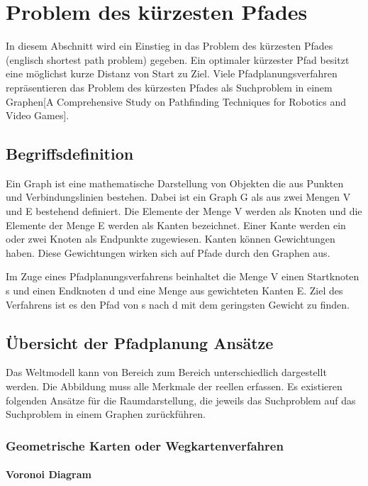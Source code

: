 \chapter{Problem des kürzesten Pfades}

In diesem Abschnitt wird ein Einstieg in das Problem des kürzesten Pfades (englisch shortest path problem) gegeben. Ein optimaler kürzester Pfad besitzt eine möglichst kurze Distanz von Start zu Ziel\cite{Madkour.05.05.2017}. Viele Pfadplanungsverfahren repräsentieren das Problem des kürzesten Pfades als Suchproblem in einem Graphen[A Comprehensive Study on Pathfinding Techniques for Robotics and Video Games].

\section{Begriffsdefinition}

Ein Graph ist eine mathematische Darstellung von Objekten die aus Punkten und Verbindungslinien bestehen. Dabei ist ein Graph G als aus zwei Mengen V und E bestehend definiert. Die Elemente der Menge V werden als Knoten und die Elemente der Menge E werden als Kanten bezeichnet. Einer Kante werden ein oder zwei Knoten als Endpunkte zugewiesen. Kanten können Gewichtungen haben. Diese Gewichtungen wirken sich auf Pfade durch den Graphen aus\cite{Gross.2004}. 

Im Zuge eines Pfadplanungsverfahrens beinhaltet die Menge V einen Startknoten s und einen Endknoten d und eine Menge aus gewichteten Kanten E. Ziel des Verfahrens ist es den Pfad von s nach d mit dem geringsten Gewicht zu finden\cite{Madkour.05.05.2017}. 

\section{Übersicht der Pfadplanung Ansätze}

Das Weltmodell kann von Bereich zum Bereich unterschiedlich dargestellt werden. Die Abbildung muss alle Merkmale der reellen erfassen.  Es existieren folgenden Ansätze für die Raumdarstellung, die jeweils das Suchproblem auf das Suchproblem in einem Graphen zurückführen.

\subsection{Geometrische Karten oder Wegkartenverfahren}

\subsubsection{Voronoi Diagram}

